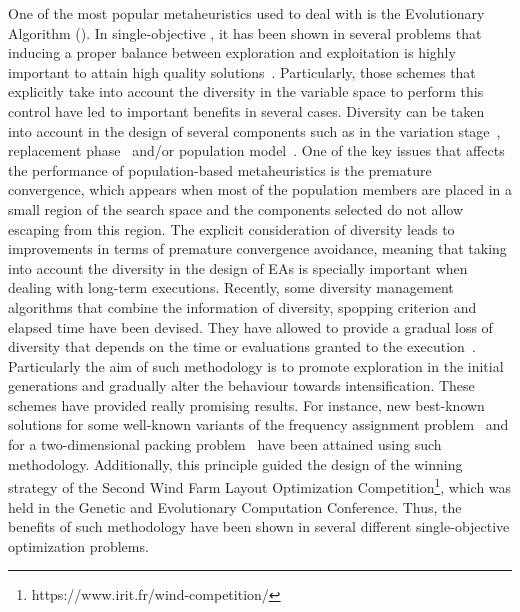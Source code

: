 One of the most popular metaheuristics used to deal with \MOPS{} is the Evolutionary Algorithm (\EA{}).
%
In single-objective \EAS{}, it has been shown in several problems that inducing a proper balance between exploration and exploitation is highly important to 
attain high quality solutions~\cite{Joel:BALANCE_DIVERSITY}.
%
Particularly, those schemes that explicitly take into account the diversity in the variable space to perform this control have led to important benefits in several cases.
%
Diversity can be taken into account in the design of several components such as in the variation stage~\cite{Joel:FUZZY_ADAPTIVE_GA,Joel:CROSSOVER_DIVERSITY}, 
replacement phase~\cite{Joel:MULTI_DYNAMIC} and/or population model~\cite{Joel:SAWTOOTH}.
%
%
One of the key issues that affects the performance of population-based metaheuristics is the premature convergence, which appears
when most of the population members are placed in a small region of the search space and the components selected do not allow escaping from this region.
%
The explicit consideration of diversity leads to improvements in terms of premature convergence avoidance, meaning that taking into account the diversity in the design of EAs is specially important 
when dealing with long-term executions.
%
Recently, some diversity management algorithms that combine the information of diversity, spopping criterion and elapsed time have been devised.
%
They have allowed to provide a gradual loss of diversity that depends on the time or evaluations granted to the execution~\cite{Joel:MULTI_DYNAMIC}.
%
Particularly the aim of such methodology is to promote exploration in the initial generations and gradually alter the behaviour towards intensification.
%
These schemes have provided really promising results.
%
For instance, new best-known solutions for some well-known variants of the frequency assignment problem~\cite{Segura:17} and for a two-dimensional packing problem~\cite{Joel:MULTI_DYNAMIC} have been attained
using such methodology.
%
Additionally, this principle guided the design of the winning strategy of the Second Wind Farm Layout Optimization Competition\footnote{https://www.irit.fr/wind-competition/}, which was held in the Genetic and Evolutionary 
Computation Conference.
%
Thus, the benefits of such methodology have been shown in several different single-objective optimization problems.

